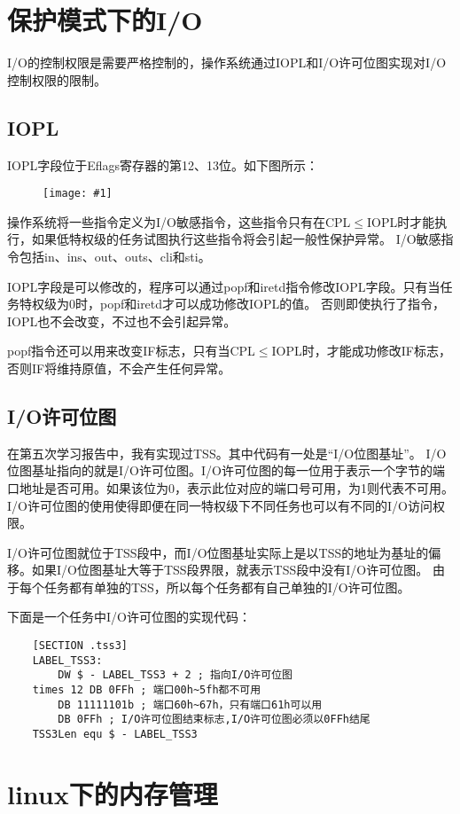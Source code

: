 \documentclass[a4paper,left=2.5cm,right=2.5cm,11pt]{article}
\newcommand{\fic}[1]{\begin{figure}[H]
		\center
		\texttt{[image: \#1]}
	\end{figure}}
\begin{document}
\clearpage

\section{保护模式下的I/O}
	I/O的控制权限是需要严格控制的，操作系统通过IOPL和I/O许可位图实现对I/O控制权限的限制。
\subsection{IOPL}
	IOPL字段位于Eflags寄存器的第12、13位。如下图所示：
	\fic{8.png}

	操作系统将一些指令定义为I/O敏感指令，这些指令只有在CPL$\le$IOPL时才能执行，如果低特权级的任务试图执行这些指令将会引起一般性保护异常。
	I/O敏感指令包括in、ins、out、outs、cli和sti。\par
	IOPL字段是可以修改的，程序可以通过popf和iretd指令修改IOPL字段。只有当任务特权级为0时，popf和iretd才可以成功修改IOPL的值。
	否则即使执行了指令，IOPL也不会改变，不过也不会引起异常。\par
	popf指令还可以用来改变IF标志，只有当CPL$\le$IOPL时，才能成功修改IF标志，否则IF将维持原值，不会产生任何异常。

\subsection{I/O许可位图}
	在第五次学习报告中，我有实现过TSS。其中代码有一处是“I/O位图基址”。
	I/O位图基址指向的就是I/O许可位图。I/O许可位图的每一位用于表示一个字节的端口地址是否可用。如果该位为0，表示此位对应的端口号可用，为1则代表不可用。
	I/O许可位图的使用使得即便在同一特权级下不同任务也可以有不同的I/O访问权限。\par
	I/O许可位图就位于TSS段中，而I/O位图基址实际上是以TSS的地址为基址的偏移。如果I/O位图基址大等于TSS段界限，就表示TSS段中没有I/O许可位图。
	由于每个任务都有单独的TSS，所以每个任务都有自己单独的I/O许可位图。\par
	下面是一个任务中I/O许可位图的实现代码：
	\begin{lstlisting}
	[SECTION .tss3]
	LABEL_TSS3:
		DW $ - LABEL_TSS3 + 2 ; 指向I/O许可位图
	times 12 DB 0FFh ; 端口00h~5fh都不可用
		DB 11111101b ; 端口60h~67h，只有端口61h可以用
		DB 0FFh ; I/O许可位图结束标志,I/O许可位图必须以0FFh结尾
	TSS3Len equ $ - LABEL_TSS3
	\end{lstlisting}

\clearpage

\section{linux下的内存管理}
\end{document}
